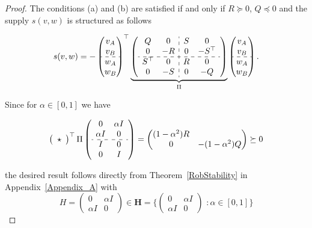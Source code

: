 \documentclass[11pt,a4paper,oneside,DIV=12,headings=small]{scrartcl}
\theoremstyle{plain}
\begin{document}
\begin{proof}The conditions (a) and (b) are satisfied if and only if $R \succeq 0$, $Q \preceq 0$ and the supply $s(v,w)$ is structured as follows 

\begin{equation}
s(v,w)=-\begin{pmatrix} v_{A} \\ v_{B} \\ \hdashline w_{A} \\ w_{B}  \end{pmatrix}^\top 
\underbrace{\left(
\begin{array}{c c : c c}
Q & 0 & S & 0 \\
0 & -R & 0 & -S^\top \\ \hdashline
S^\top & 0 & R & 0 \\
0 & -S & 0 & -Q
\end{array}
\right)}_\Pi
\begin{pmatrix} v_{A} \\ v_{B} \\ \hdashline w_{A} \\ w_{B}  \end{pmatrix}.
\end{equation}
 
Since for $\alpha \in [0,1]$ we have

\begin{equation}
\left(
\begin{array}{c }\star
\end{array}
 \right)^\top
 \Pi
\left(
\begin{array}{c c}
0 & \alpha I \\
\alpha I & 0 \\ \hdashline
I & 0 \\
0 & I 
\end{array}
 \right)=
 \begin{pmatrix}
 (1-\alpha^2)R & \\
 0 & -(1-\alpha^2)Q
 \end{pmatrix}\succeq 0
\end{equation}

the desired result follows directly from Theorem~\ref{RobStability} in Appendix~\ref{Appendix_A} with \[H = \begin{pmatrix} 0 & \alpha I \\ \alpha I & 0 \end{pmatrix} \in \mathbf{H}=\Big\{ \begin{pmatrix} 0 & \alpha I \\ \alpha I & 0 \end{pmatrix} \,\, : \alpha \in [0,1] \Big\}\]
\end{proof}
\end{document}
